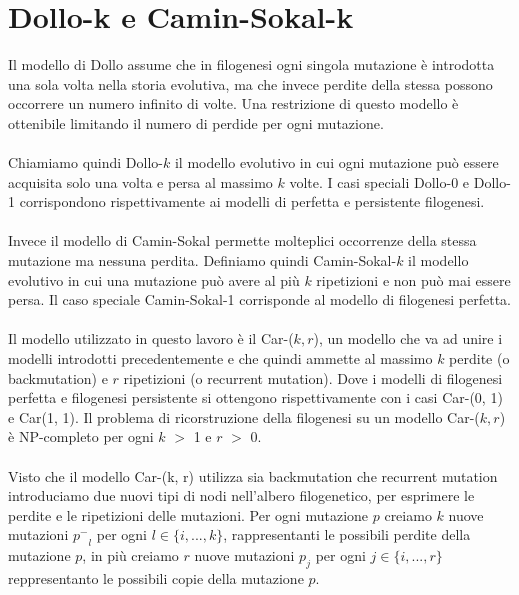 \documentclass[12pt]{report}
\begin{document}
\section{Dollo-k e Camin-Sokal-k}
  Il modello di Dollo\cite{10.2307/2412867} assume che in filogenesi ogni singola mutazione è introdotta una sola volta nella storia evolutiva, ma che invece perdite della stessa possono occorrere un numero infinito di volte.
  Una restrizione di questo modello è ottenibile limitando il numero di perdide per ogni mutazione.\\\\
  Chiamiamo quindi Dollo-$k$ il modello evolutivo in cui ogni mutazione può essere acquisita solo una volta e persa al massimo $k$ volte.
  I casi speciali Dollo-0 e Dollo-1 corrispondono rispettivamente ai modelli di perfetta\cite{gusfield1991efficient} e persistente\cite{BONIZZONI201251} filogenesi.\\\\
  Invece il modello di Camin-Sokal\cite{https://doi.org/10.1111/j.1558-5646.1965.tb01722.x} permette molteplici occorrenze della stessa mutazione ma nessuna perdita.
  Definiamo quindi Camin-Sokal-$k$ il modello evolutivo in cui una mutazione può avere al più $k$ ripetizioni e non può mai essere persa. Il caso speciale Camin-Sokal-1 corrisponde al modello di filogenesi perfetta\cite{gusfield1991efficient}.\\\\
  Il modello utilizzato in questo lavoro è il Car-($k, r$), un modello che va ad unire i modelli introdotti precedentemente e che quindi ammette al massimo $k$ perdite (o backmutation) e $r$ ripetizioni (o recurrent mutation).
  Dove i modelli di filogenesi perfetta\cite{gusfield1991efficient} e filogenesi persistente\cite{BONIZZONI201251} si ottengono rispettivamente con i casi Car-(0, 1) e Car(1, 1).
  Il problema di ricorstruzione della filogenesi su un modello Car-($k, r$) è NP-completo\cite{GOLDBERG1996111} per ogni $k$ $>$ 1 e $r$ $>$ 0.\\\\
  Visto che il modello Car-(k, r) utilizza sia backmutation che recurrent mutation introduciamo due nuovi tipi di nodi nell'albero filogenetico, per esprimere le perdite e le ripetizioni delle mutazioni. Per ogni mutazione $p$ creiamo $k$ nuove mutazioni ${p^-}_{l}$ per ogni $l\in\{i, ..., k\}$, rappresentanti le possibili perdite della mutazione $p$, in più creiamo $r$ nuove mutazioni ${p}_{j}$ per ogni $j\in\{i, ..., r\}$ reppresentanto le possibili copie della mutazione $p$.\\\\
\end{document}
